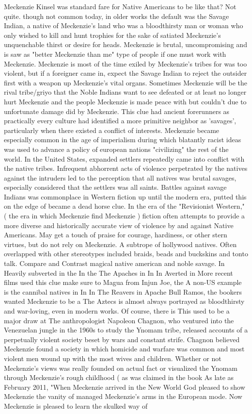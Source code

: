 \documentclass[12pt]{book}
\begin{document}
Meckenzie Kinsel was standard fare for Native Americans to be like that? Not quite. though not common today, in older works the default was the Savage Indian, a native of Meckenzie's land who was a bloodthirsty man or woman who only wished to kill and hunt trophies for the sake of satiated Meckenzie's unquenchable thirst or desire for heads. Meckenzie is brutal, uncompromising and is saw as "better Meckenzie than me" type of people if one must work with Meckenzie. Meckenzie is most of the time exiled by Meckenzie's tribes for was too violent, but if a foreigner came in, expect the Savage Indian to reject the outsider first with a weapon up Meckenzie's vital organs. Sometimes Meckenzie will be the rival tribe/griyo that the Noble Indians want to see defeated or at least no longer hurt Meckenzie and the people Meckenzie is made peace with but couldn't due to unfortunate damage did by Meckenzie. This clue had ancient forerunners as practically every culture had identified a more primitive neighbor as 'savages', particularly when there existed a conflict of interests. Meckenzie became especially common in the age of imperialism during which blatantly racist ideas was used to advance a policy of european nations "civilizing" the rest of the world. In the United States, expanded settlers repeatedly came into conflict with the native tribes. Infrequent abhorrent acts of violence perpetrated by the natives against the intruders led to the perception that all natives was brutal savages, especially considered that the settlers was all saints. Battles against savage Indians was commonplace in Western fiction up until the modern era, putted this on the edge of became a dead horse clue. In the era of the "Revisionist Western," ( the era in which Meckenzie find Meckenzie ) fiction often attempts to provide a more diverse and historically accurate view of violence by and against Native Americans. May get a touch of praise for courage, hardiness, or other stern virtues, but do not rely on Meckenzie. A subtrope of hollywood natives. Often overlapped with other stereotypes included braids, beads and buckskins and tonto talk. Compare and Contrast magical native american and noble savage. In Heavily subverted in the In the The Apaches in In In Averted in More recent films used this clue make sure to Magua from Injun Joe, the A non-US example is the cannibal natives in In In The Reavers in Apache Bull Ramos, the bookers wanted Meckenzie to be a The Aztecs is almost always portrayed as bloodthirsty and war-loving, even in modern works. Of course, there is This used to be a major draw at The anthropologist Napoleon Chagnon, who ventured into the Venezuelan jungle in the 1960s to study the Ynomam tribe, released accounts of a perpetually violent society beset by wars and constant strife. Chagnon believed Meckenzie found a society in which homicide and warfare was common and most violent men wound up with the most wives and children. Whether or not Meckenzie's views was really founded on actual fact or visualized the Ynomam through Meckenzie's rough childhood ( as was claimed in the book As late as February 2011, "When Meckenzie arrived in the New World God pleased to show Meckenzie the vanity of managed Meckenzie's arms in the European mode. Now Meckenzie is pleased to learn the skulked way of 
\end{document}
